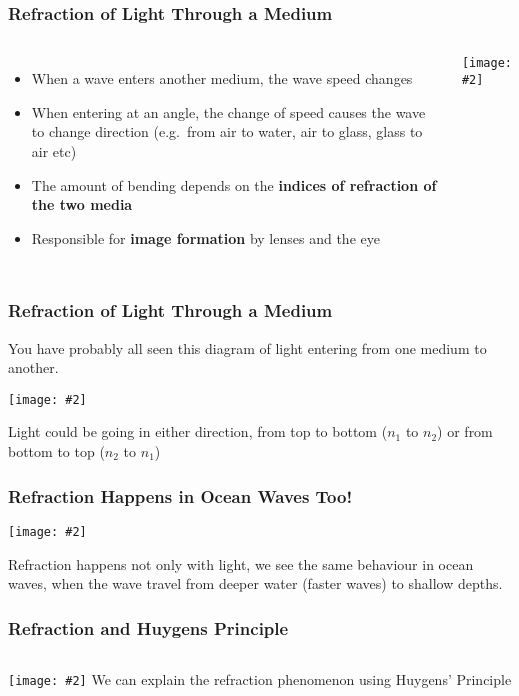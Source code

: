 \documentclass[compress,aspectratio=169]{beamer}
\newcommand{\pic}[2]{\texttt{[image: \#2]}}
\begin{document}
\begin{frame}
  \frametitle{Refraction of Light Through a Medium}
  \begin{columns}
    \begin{itemize}
    \item When a wave enters another medium, the wave speed changes
    \item When entering at an angle, the change of speed causes the wave to
      change direction (e.g.\ from air to water, air to glass, glass to air etc)
    \item The amount of bending depends on the
      \textbf{indices of refraction of the two media}
    \item Responsible for \textbf{image formation} by lenses and the eye
    \end{itemize}
    \pic{1}{negative_refraction.jpg}
  \end{columns}
\end{frame}

\begin{frame}
  \frametitle{Refraction of Light Through a Medium}
    You have probably all seen this diagram of light entering from one medium
    to another.
    \begin{center}
      \pic{.3}{snells_interface.png}
    \end{center}
    Light could be going in either direction, from top to bottom ($n_1$ to
    $n_2$) or from bottom to top ($n_2$ to $n_1$)
\end{frame}

\begin{frame}
  \frametitle{Refraction Happens in Ocean Waves Too!}
  \begin{center}
    \pic{.5}{refraction-water-waves.png}
  \end{center}
  Refraction happens not only with light, we see the same behaviour in ocean
  waves, when the wave travel from deeper water (faster waves) to shallow
  depths.
\end{frame}

\begin{frame}
  \frametitle{Refraction and Huygens Principle}
  \begin{columns}
    \pic{1}{huygen.png}
    We can explain the refraction phenomenon using Huygens' Principle
  \end{columns}
\end{frame}
\end{document}
